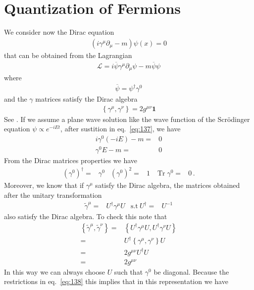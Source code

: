 \section{Quantization of Fermions}
\label{sec:quant-ferm}
We consider now the Dirac equation
\begin{align}
\label{eq:137}
  (i\gamma^\mu\partial_\mu-m)\psi(x)=0
\end{align}
that can be obtained from the Lagrangian
\begin{align}
  \mathcal{L}=i\overline{\psi}\gamma^\mu\partial_\mu\psi-m\overline{\psi}\psi
\end{align}
where
\begin{align}
  \overline{\psi}=\psi^\dagger\gamma^0
\end{align}
and the $\gamma$ matrices satisfy the Dirac algebra
\begin{align}
\label{eq:140}
\left\{\gamma^\mu,\gamma^\nu\right\} = 2g^{\mu\nu}\mathbf{1}
\end{align}
See \cite{lsm}.
If we assume a plane wave solution like the wave function of the Scr\"odinger equation $\psi\propto e^{-i E t}$, after sustition in eq.~\eqref{eq:137}, we have
\begin{align}
  \label{eq:139}
  i \gamma^0 (-i E)-m=&0\nonumber\\
   \gamma^0 E-m=&0
\end{align}
From the Dirac matrices properties we have
\begin{align}
  \label{eq:138}
\left(\gamma^0\right)^\dagger=&\gamma^0 & \left(\gamma^0\right)^2=&1 & \operatorname{Tr}\gamma^0=&0\,.
\end{align}
Moreover, we know that if $\gamma^\mu$ satisfy the Dirac algebra, the matrices obtained after the unitary transformation
\begin{align}
  \widetilde{\gamma}^\mu=&U^\dagger \gamma^\mu U & \text{s.t}\ U^\dagger=&U^{-1}
\end{align}
also satisfy the Dirac algebra. To check this note that
\begin{align}
  \left\{\widetilde{\gamma}^\mu,\widetilde{\gamma}^\nu\right\}=&
   \left\{U^\dagger{\gamma}^\mu U,U^\dagger{\gamma}^\nu U\right\}\nonumber\\
=&U^\dagger\left\{{\gamma}^\mu,{\gamma}^\nu\right\}U\nonumber\\
=&2g^{\mu\nu}U^\dagger U\nonumber\\
=&2g^{\mu\nu}
\end{align}
In this way we can always choose $U$ such that $\gamma^0$ be diagonal. Because the restrictions in eq.~\eqref{eq:138} this implies that in this representation we have
